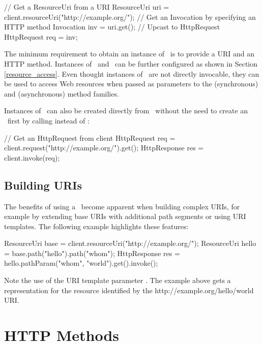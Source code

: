 \begin{listing}{1}
// Get a ResourceUri from a URI
ResourceUri uri = client.resourceUri("http://example.org/");
// Get an Invocation by specifying an HTTP method
Invocation inv = uri.get();
// Upcast to HttpRequest
HttpRequest req = inv;
\end{listing}

The minimum requirement to obtain an instance of \Invocation\ is to provide a URI and an HTTP method. Instances of \Invocation\ and \HttpRequest\ can be further configured as shown in Section \ref{resource_access}. Even thought instances of \HttpRequest\ are not directly invocable, they can be used to access Web resources when passed as parameters to the  (synchronous) and  (asynchronous) method families.

Instances of \HttpRequest\ can also be created directly from \Client\ without the need to create an \Invocation\ first by calling  instead of :

\begin{listing}{1}
// Get an HttpRequest from client
HttpRequest req = client.request("http://example.org/").get();
HttpResponse res = client.invoke(req);
\end{listing}

\subsection{Building URIs}

The benefits of using a \ResourceUri\ become apparent when building complex URIs, for example by extending base URIs with additional path segments or using URI templates. The following example highlights these features:

\begin{listing}{1}
ResourceUri base = client.resourceUri("http://example.org/");
ResourceUri hello = base.path("hello").path("{whom}");   
HttpResponse res = hello.pathParam("whom", "world").get().invoke();
\end{listing}

Note the use of the URI template parameter . The example above gets a representation for the resource identified by the http://example.org/hello/world URI.

\section{HTTP Methods}

